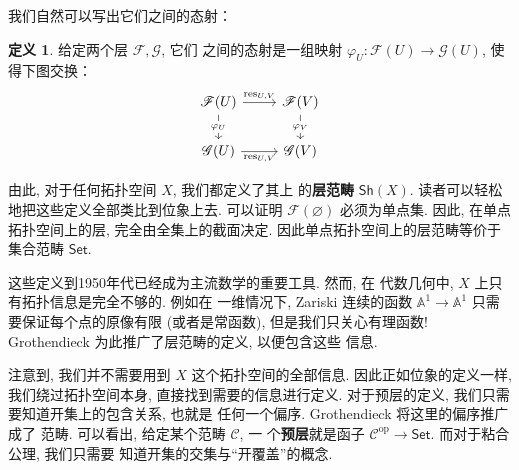 \documentclass[UTF8]{ctexbook}
\theoremstyle{plain}
\theoremstyle{definition}
\newtheorem{definition}{定义}[chapter]
\theoremstyle{remark}
\begin{document}
我们自然可以写出它们之间的态射：
\begin{definition}
给定两个层 \(\mathscr F, \mathscr G\), 它们
之间的态射是一组映射 \(\varphi_U : \mathscr F(U) \to \mathscr G(U)\),
使得下图交换：
\[\begin{tikzcd}
{\mathscr F(U)} & {\mathscr F(V)} \\
{\mathscr G(U)} & {\mathscr G(V)}
\arrow["{\mathrm{res}_{U,V}}", from=1-1, to=1-2]
\arrow["{\mathrm{res}_{U,V}}"', from=2-1, to=2-2]
\arrow["{\varphi_U}"{description}, from=1-1, to=2-1]
\arrow["{\varphi_V}"{description}, from=1-2, to=2-2]
\end{tikzcd}\]
\end{definition}
由此, 对于任何拓扑空间 \(X\), 我们都定义了其上
的\textbf{层范畴} \(\mathsf{Sh}(X)\).
读者可以轻松地把这些定义全部类比到位象上去.
可以证明 \(\mathscr F(\varnothing)\) 必须为单点集.
因此, 在单点拓扑空间上的层, 完全由全集上的截面决定.
因此单点拓扑空间上的层范畴等价于集合范畴 \(\mathsf{Set}\).

这些定义到1950年代已经成为主流数学的重要工具. 然而, 在
代数几何中, \(X\) 上只有拓扑信息是完全不够的. 例如在
一维情况下, Zariski 连续的函数 \(\mathbb A^1 \to \mathbb A^1\)
只需要保证每个点的原像有限 (或者是常函数), 但是我们只关心有理函数!
Grothendieck 为此推广了层范畴的定义, 以便包含这些
信息.

注意到, 我们并不需要用到 \(X\) 这个拓扑空间的全部信息.
因此正如位象的定义一样, 我们绕过拓扑空间本身, 直接找到需要的信息进行定义.
对于预层的定义, 我们只需要知道开集上的包含关系, 也就是
任何一个偏序. Grothendieck 将这里的偏序推广成了
范畴. 可以看出, 给定某个范畴 \(\mathcal C\), 一
个\textbf{预层}就是函子 \(\mathcal C^{\mathrm{op}}
\to \mathsf{Set}\). 而对于粘合公理, 我们只需要
知道开集的交集与“开覆盖”的概念.
\end{document}
